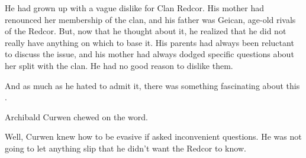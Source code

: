 He had grown up with a vague dislike for Clan Redcor. 
His mother had renounced her membership of the clan, and his father was Geican, age-old rivals of the Redcor. 
But, now that he thought about it, he realized that he did not really have anything on which to base it. 
His parents had always been reluctant to discuss the issue, and his mother had always dodged specific questions about her split with the clan. 
He had no good reason to dislike them. 

And as much as he hated to admit it, there was something fascinating about this \Chyrie{} \Esmerel. 









\begin{comment}
\subsection{Curwen}
\end{comment}

\new
{} 

Archibald Curwen chewed on the word. 

Well, Curwen knew how to be evasive if asked inconvenient questions. 
He was not going to let anything slip that he didn't want the Redcor to know. 








\begin{comment}
\subsection{\Racel}
\end{comment}

